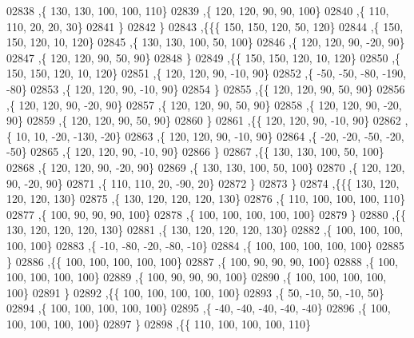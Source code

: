 \begin{DoxyCode}
02838     ,\{   130,   130,   100,   100,   110\}
02839     ,\{   120,   120,    90,    90,   100\}
02840     ,\{   110,   110,    20,    20,    30\}
02841     \}
02842    \}
02843   ,\{\{\{   150,   150,   120,    50,   120\}
02844     ,\{   150,   150,   120,    10,   120\}
02845     ,\{   130,   130,   100,    50,   100\}
02846     ,\{   120,   120,    90,   -20,    90\}
02847     ,\{   120,   120,    90,    50,    90\}
02848     \}
02849    ,\{\{   150,   150,   120,    10,   120\}
02850     ,\{   150,   150,   120,    10,   120\}
02851     ,\{   120,   120,    90,   -10,    90\}
02852     ,\{   -50,   -50,   -80,  -190,   -80\}
02853     ,\{   120,   120,    90,   -10,    90\}
02854     \}
02855    ,\{\{   120,   120,    90,    50,    90\}
02856     ,\{   120,   120,    90,   -20,    90\}
02857     ,\{   120,   120,    90,    50,    90\}
02858     ,\{   120,   120,    90,   -20,    90\}
02859     ,\{   120,   120,    90,    50,    90\}
02860     \}
02861    ,\{\{   120,   120,    90,   -10,    90\}
02862     ,\{    10,    10,   -20,  -130,   -20\}
02863     ,\{   120,   120,    90,   -10,    90\}
02864     ,\{   -20,   -20,   -50,   -20,   -50\}
02865     ,\{   120,   120,    90,   -10,    90\}
02866     \}
02867    ,\{\{   130,   130,   100,    50,   100\}
02868     ,\{   120,   120,    90,   -20,    90\}
02869     ,\{   130,   130,   100,    50,   100\}
02870     ,\{   120,   120,    90,   -20,    90\}
02871     ,\{   110,   110,    20,   -90,    20\}
02872     \}
02873    \}
02874   ,\{\{\{   130,   120,   120,   120,   130\}
02875     ,\{   130,   120,   120,   120,   130\}
02876     ,\{   110,   100,   100,   100,   110\}
02877     ,\{   100,    90,    90,    90,   100\}
02878     ,\{   100,   100,   100,   100,   100\}
02879     \}
02880    ,\{\{   130,   120,   120,   120,   130\}
02881     ,\{   130,   120,   120,   120,   130\}
02882     ,\{   100,   100,   100,   100,   100\}
02883     ,\{   -10,   -80,   -20,   -80,   -10\}
02884     ,\{   100,   100,   100,   100,   100\}
02885     \}
02886    ,\{\{   100,   100,   100,   100,   100\}
02887     ,\{   100,    90,    90,    90,   100\}
02888     ,\{   100,   100,   100,   100,   100\}
02889     ,\{   100,    90,    90,    90,   100\}
02890     ,\{   100,   100,   100,   100,   100\}
02891     \}
02892    ,\{\{   100,   100,   100,   100,   100\}
02893     ,\{    50,   -10,    50,   -10,    50\}
02894     ,\{   100,   100,   100,   100,   100\}
02895     ,\{   -40,   -40,   -40,   -40,   -40\}
02896     ,\{   100,   100,   100,   100,   100\}
02897     \}
02898    ,\{\{   110,   100,   100,   100,   110\}

\end{DoxyCode}
